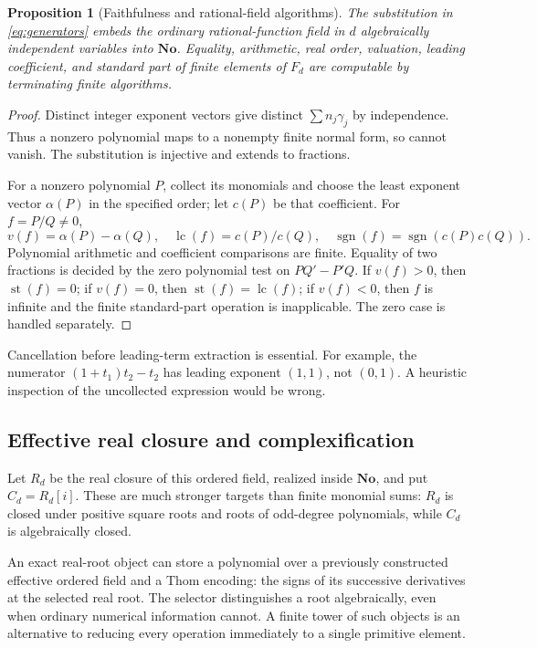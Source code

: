 \documentclass[11pt,letterpaper]{article}
\newtheorem{proposition}[theorem]{Proposition}
\theoremstyle{definition}
\newcommand{\No}{\mathbf{No}}
\newcommand{\st}{\operatorname{st}}
\newcommand{\lc}{\operatorname{lc}}
\newcommand{\sgn}{\operatorname{sgn}}
\numberwithin{equation}{section}
\begin{document}
\begin{proposition}[Faithfulness and rational-field algorithms]\label{prop:core}
The substitution in \eqref{eq:generators} embeds the ordinary rational-function field in $d$ algebraically independent variables into $\No$. Equality, arithmetic, real order, valuation, leading coefficient, and standard part of finite elements of $F_d$ are computable by terminating finite algorithms.
\end{proposition}
\begin{proof}
Distinct integer exponent vectors give distinct $\sum n_j\gamma_j$ by independence. Thus a nonzero polynomial maps to a nonempty finite normal form, so cannot vanish. The substitution is injective and extends to fractions.

For a nonzero polynomial $P$, collect its monomials and choose the least exponent vector $\alpha(P)$ in the specified order; let $c(P)$ be that coefficient. For $f=P/Q\ne0$,
\begin{equation}\label{eq:leadingrational}
 v(f)=\alpha(P)-\alpha(Q),\quad
 \lc(f)=c(P)/c(Q),\quad
 \sgn(f)=\sgn(c(P)c(Q)).
\end{equation}
Polynomial arithmetic and coefficient comparisons are finite. Equality of two fractions is decided by the zero polynomial test on $PQ'-P'Q$. If $v(f)>0$, then $\st(f)=0$; if $v(f)=0$, then $\st(f)=\lc(f)$; if $v(f)<0$, then $f$ is infinite and the finite standard-part operation is inapplicable. The zero case is handled separately.
\end{proof}
Cancellation before leading-term extraction is essential. For example, the numerator $(1+t_1)t_2-t_2$ has leading exponent $(1,1)$, not $(0,1)$. A heuristic inspection of the uncollected expression would be wrong.

\subsection{Effective real closure and complexification}
Let $R_d$ be the real closure of this ordered field, realized inside $\No$, and put $C_d=R_d[i]$. These are much stronger targets than finite monomial sums: $R_d$ is closed under positive square roots and roots of odd-degree polynomials, while $C_d$ is algebraically closed.

An exact real-root object can store a polynomial over a previously constructed effective ordered field and a Thom encoding: the signs of its successive derivatives at the selected real root. The selector distinguishes a root algebraically, even when ordinary numerical information cannot. A finite tower of such objects is an alternative to reducing every operation immediately to a single primitive element.
\end{document}
